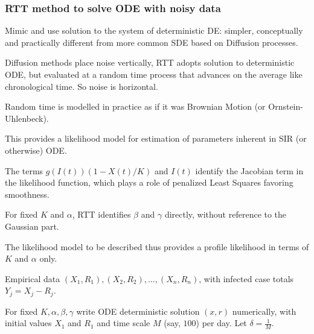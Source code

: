 \documentclass[notes]{beamer}
\begin{document}
\begin{frame}
\frametitle{RTT method to solve ODE with noisy data} 
\bigskip

\noindent Mimic and use solution to the system of deterministic DE: simpler, conceptually and practically different from more common SDE based on Diffusion processes.

\bigskip

\noindent Diffusion methods place noise vertically, RTT adopts solution to deterministic ODE, but evaluated at a random time process that advances on the average like chronological time. So noise is horizontal. 

\end{frame}
\begin{frame}
\noindent Random time is modelled in practice as if it was Brownian Motion (or Ornstein-Uhlenbeck). 

\bigskip

\noindent This provides a likelihood model for estimation of parameters inherent in SIR (or otherwise) ODE. 

\bigskip

\noindent The terms $g(I(t)) (1 - X(t)/K)$ and $I(t)$ identify the Jacobian term in the likelihood function, which plays a role of penalized Least Squares favoring  smoothness.

\end{frame}
\begin{frame}
\noindent For fixed $K$ and $\alpha$, RTT identifies $\beta$ and $\gamma$ directly, without reference to the Gaussian part. 

\noindent The likelihood model to be described thus provides a profile likelihood in terms of $K$ and $\alpha$ only.

\bigskip

\noindent Empirical data $(X_1,R_1), (X_2,R_2), \dots, (X_n, R_n)$, with infected case totals $Y_j=X_j-R_j$. 

\bigskip

\noindent For fixed $K, \alpha, \beta, \gamma$ write ODE deterministic solution $(x,r)$ numerically, with initial values $X_1$ and $R_1$ and time scale $M$ (say, $100$) per day. Let $\delta=\frac{1}{M}$.   

\end{frame}
\end{document}
